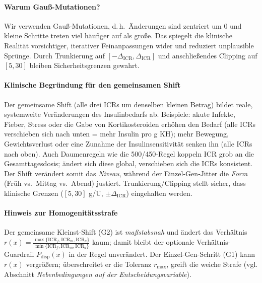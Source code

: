 \documentclass[ngerman,a4paper,12pt,pdftex]{article}
\newcommand{\ICRf}{\mathrm{ICR}_f}
\newcommand{\ICRm}{\mathrm{ICR}_m}
\newcommand{\ICRa}{\mathrm{ICR}_a}
\newcommand{\DICR}{\Delta_{\mathrm{ICR}}}
\newcommand{\rmax}{r_{\max}}
\begin{document}
\paragraph{Warum Gauß-Mutationen?}
Wir verwenden Gauß‑Mutationen, d.\,h.\ Änderungen sind zentriert um \(0\) und kleine Schritte treten viel häufiger auf als große. Das spiegelt die klinische Realität vorsichtiger, iterativer Feinanpassungen wider und reduziert unplausible Sprünge. Durch Trunkierung auf \([-\DICR,\DICR]\) und anschließendes Clipping auf \([5,30]\) bleiben Sicherheitsgrenzen gewahrt.

\paragraph{Klinische Begründung für den gemeinsamen Shift}
Der gemeinsame Shift (alle drei ICRs um denselben kleinen Betrag) bildet reale, systemweite Veränderungen des Insulinbedarfs ab. Beispiele: akute Infekte, Fieber, Stress oder die Gabe von Kortikosteroiden erhöhen den Bedarf (alle ICRs verschieben sich nach unten = mehr Insulin pro g KH); mehr Bewegung, Gewichtsverlust oder eine Zunahme der Insulinsensitivität senken ihn (alle ICRs nach oben). Auch Daumenregeln wie die 500/450‑Regel koppeln ICR grob an die Gesamttagesdosis; ändert sich diese global, verschieben sich die ICRs konsistent. Der Shift verändert somit das \emph{Niveau}, während der Einzel‑Gen‑Jitter die \emph{Form} (Früh vs.\ Mittag vs.\ Abend) justiert. Trunkierung/Clipping stellt sicher, dass klinische Grenzen (\([5,30]\) g/U, \(\pm\DICR\)) eingehalten werden.

\paragraph{Hinweis zur Homogenitätsstrafe}
Der gemeinsame Kleinst-Shift (G2) ist \emph{maßstabsnah} und ändert das Verhältnis \(r(x)=\tfrac{\max\{\ICRf,\ICRm,\ICRa\}}{\min\{\ICRf,\ICRm,\ICRa\}}\) kaum; damit bleibt der optionale Verhältnis-Guardrail \(P_{\mathrm{disp}}(x)\) in der Regel unverändert. Der Einzel-Gen-Schritt (G1) kann \(r(x)\) vergrößern; überschreitet er die Toleranz \(\rmax\), greift die weiche Strafe (vgl. Abschnitt \emph{Nebenbedingungen auf der Entscheidungsvariable}).
\end{document}
